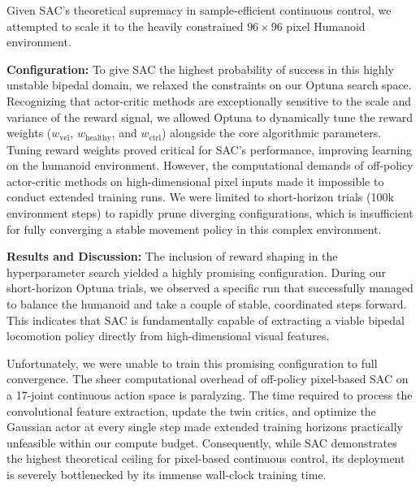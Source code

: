 Given SAC's theoretical supremacy in sample-efficient continuous control, we attempted to scale it to the heavily constrained $96 \times 96$ pixel Humanoid environment. 

\textbf{Configuration:}
To give SAC the highest probability of success in this highly unstable bipedal domain, we relaxed the constraints on our Optuna search space. Recognizing that actor-critic methods are exceptionally sensitive to the scale and variance of the reward signal, we allowed Optuna to dynamically tune the reward weights ($w_{\text{vel}}$, $w_{\text{healthy}}$, and $w_{\text{ctrl}}$) alongside the core algorithmic parameters. 
Tuning reward weights proved critical for SAC's performance, improving learning on the humanoid environment. However, the computational demands of off-policy actor-critic methods on high-dimensional pixel inputs made it impossible to conduct extended training runs. We were limited to short-horizon trials (100k environment steps) to rapidly prune diverging configurations, which is insufficient for fully converging a stable movement policy in this complex environment.

\textbf{Results and Discussion:}
The inclusion of reward shaping in the hyperparameter search yielded a highly promising configuration. During our short-horizon Optuna trials, we observed a specific run that successfully managed to balance the humanoid and take a couple of stable, coordinated steps forward. This indicates that SAC is fundamentally capable of extracting a viable bipedal locomotion policy directly from high-dimensional visual features.

Unfortunately, we were unable to train this promising configuration to full convergence. The sheer computational overhead of off-policy pixel-based SAC on a 17-joint continuous action space is paralyzing. The time required to process the convolutional feature extraction, update the twin critics, and optimize the Gaussian actor at every single step made extended training horizons practically unfeasible within our compute budget. Consequently, while SAC demonstrates the highest theoretical ceiling for pixel-based continuous control, its deployment is severely bottlenecked by its immense wall-clock training time.